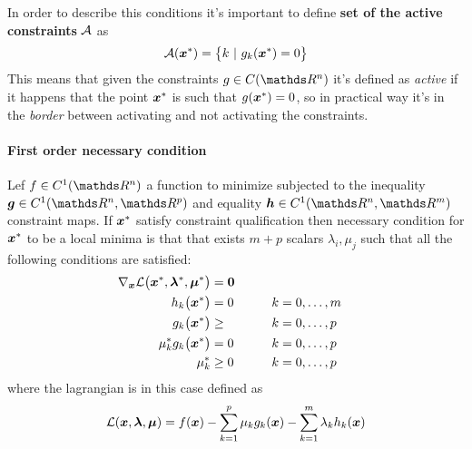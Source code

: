 	In order to describe this conditions it's important to define \textbf{set of the active constraints} $\mathcal A$ as
	\[ \mathcal A(\boldsymbol{x}^*) = \big\{ k \ | \ g_k(\boldsymbol{x}^*) = 0 \big\} \]
	This means that given the constraints $g\in C(\R^n)$ it's defined as \textit{active} if it happens that the point $\boldsymbol{x}^*$ is such that $g(\boldsymbol{x}^*) = 0$, so in practical way it's in the \textit{border} between activating and not activating the constraints.
	
	\paragraph{First order necessary condition} Lef $f\in C^1(\R^n)$ a function to minimize subjected to the inequality $\vett g\in C^1(\R^n,\R^p)$ and equality $\vett h \in C^1(\R^n,\R^m)$ constraint maps. If $\boldsymbol{x}^*$ satisfy constraint qualification then necessary condition for $\boldsymbol{x}^*$ to be a local minima is that that exists $m+p$ scalars $\lambda_i,\mu_j$ such that all the following conditions are satisfied:
	\begin{equation} \label{eq:min:kkt:firstnecessary}
	\begin{aligned}
		\nabla_{\boldsymbol{x}} \mathcal L \big(\boldsymbol{x}^*,\boldsymbol{\lambda}^*,\boldsymbol{\mu}^*\big) & = \boldsymbol{0} \\
		h_k\big(\boldsymbol{x}^*\big) & =  0 \qquad && k = 0,\dots, m\\
		g_k\big(\boldsymbol{x}^*\big) & \geq && k = 0,\dots, p \\
		\mu_k^* g_k\big(\boldsymbol{x}^*\big) & = 0 && k = 0,\dots, p \\
		\mu_k^* & \geq 0 && k = 0,\dots,p
	\end{aligned}
	\end{equation}
	where the lagrangian is in this case defined as
	\[ \mathcal L(\boldsymbol{x},\boldsymbol{\lambda},\boldsymbol{\mu}) = f(\boldsymbol{x}) - \sum_{k=1}^p \mu_k g_k(\boldsymbol{x})  - \sum_{k=1}^m \lambda_k h_k(\boldsymbol{x}) \]
	
